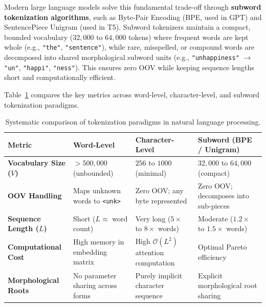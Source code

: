 \documentclass[11pt,a4paper]{article}
\begin{document}
Modern large language models solve this fundamental trade-off through \textbf{subword tokenization algorithms}, such as Byte-Pair Encoding (BPE, used in GPT) and SentencePiece Unigram (used in T5). Subword tokenizers maintain a compact, bounded vocabulary ($32{,}000$ to $64{,}000$ tokens) where frequent words are kept whole (e.g., \texttt{"the"}, \texttt{"sentence"}), while rare, misspelled, or compound words are decomposed into shared morphological subword units (e.g., \texttt{"unhappiness"} $\to$ \texttt{"un"}, \texttt{"happi"}, \texttt{"ness"}). This ensures zero OOV while keeping sequence lengths short and computationally efficient.

Table~\ref{tab:tokenization_comparison} compares the key metrics across word-level, character-level, and subword tokenization paradigms.

\begin{table}[htbp]
\centering
\small
\begin{tabularx}{\textwidth}{lXXX}
\toprule
\textbf{Metric} & \textbf{Word-Level} & \textbf{Character-Level} & \textbf{Subword (BPE / Unigram)} \\
\midrule
\textbf{Vocabulary Size ($V$)} & $> 500{,}000$ (unbounded) & $256$ to $1000$ (minimal) & $32{,}000$ to $64{,}000$ (compact) \\
\textbf{OOV Handling} & Maps unknown words to \texttt{<unk>} & Zero OOV; any byte represented & Zero OOV; decomposes into sub-pieces \\
\textbf{Sequence Length ($L$)} & Short ($L \approx$ word count) & Very long ($5\times$ to $8\times$ words) & Moderate ($1.2\times$ to $1.5\times$ words) \\
\textbf{Computational Cost} & High memory in embedding matrix & High $\mathcal{O}(L^2)$ attention computation & Optimal Pareto efficiency \\
\textbf{Morphological Roots} & No parameter sharing across forms & Purely implicit character sequence & Explicit morphological root sharing \\
\bottomrule
\end{tabularx}
\caption{Systematic comparison of tokenization paradigms in natural language processing.}
\label{tab:tokenization_comparison}
\end{table}
\end{document}

